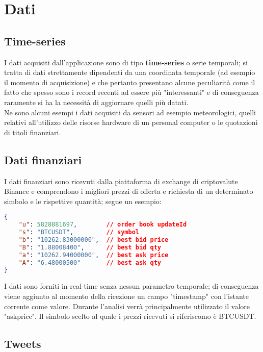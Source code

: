 \section{Dati}

\subsection{Time-series}

I dati acquisiti dall'applicazione sono di tipo \textbf{time-series} o serie
temporali; si tratta di dati strettamente dipendenti da una coordinata temporale (ad esempio
il momento di acquisizione) e che pertanto presentano alcune peculiarità come il fatto
che spesso sono i record recenti ad essere più "interessanti" e di conseguenza raramente si ha
la necessità di aggiornare quelli più datati.
\\
Ne sono alcuni esempi i dati acquisiti da sensori ad esempio meteorologici, quelli relativi
all'utilizzo delle risorse hardware di un personal computer o le quotazioni di titoli finanziari.

\subsection{Dati finanziari}

I dati finanziari sono ricevuti dalla piattaforma di exchange di criptovalute Binance \cite{binance}
e comprendono i migliori prezzi di offerta e richiesta di un determinato simbolo e le rispettive
quantità; segue un esempio:

\begin{lstlisting}[language=json,firstnumber=1]
{
    "u": 5828881697,        // order book updateId
    "s": "BTCUSDT",         // symbol
    "b": "10262.83000000",  // best bid price
    "B": "1.88008400",      // best bid qty
    "a": "10262.94000000",  // best ask price
    "A": "6.48000500"       // best ask qty
}
\end{lstlisting}
%
I dati sono forniti in real-time senza nessun parametro temporale; di conseguenza viene
aggiunto al momento della ricezione un campo "timestamp" con l'istante corrente come valore.
Durante l'analisi verrà principalmente utilizzato il valore "askprice".
Il simbolo scelto al quale i prezzi ricevuti si riferiscomo è BTCUSDT.

\subsection{Tweets}

